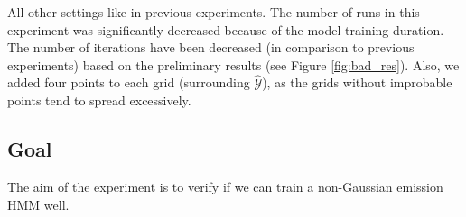 \documentclass[shortabstract]{iithesis}
\begin{document}
All other settings like in previous experiments. The number of runs in this experiment was significantly decreased because of the model training duration. The number of iterations have been decreased (in comparison to previous experiments) based on the preliminary results (see Figure \ref{fig:bad_res}). Also, we added four points to each grid (surrounding $\hat{\mathcal Y}$), as the grids without improbable points tend to spread excessively. 

\subsection{Goal}

The aim of the experiment is to verify if we can train a non-Gaussian emission HMM well. 










\end{document}
